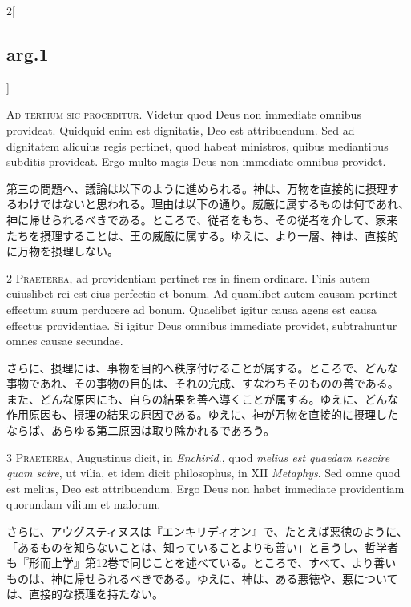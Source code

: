 \documentclass[paper=a4paper,fontsize=10pt,jafontsize=9pt,titlepage]{jlreq}
\begin{document}
\begin{paracol}{2}[\subsection{arg.1}]

{\Huge A}{\scshape d tertium sic proceditur}. Videtur quod
Deus non immediate omnibus provideat. Quidquid enim est dignitatis, Deo
est attribuendum. Sed ad dignitatem alicuius regis pertinet, quod habeat
ministros, quibus mediantibus subditis provideat. Ergo multo magis Deus
non immediate omnibus providet.

\switchcolumn

第三の問題へ、議論は以下のように進められる。神は、万物を直接的に摂理す
るわけではないと思われる。理由は以下の通り。威厳に属するものは何であれ、
神に帰せられるべきである。ところで、従者をもち、その従者を介して、家来
たちを摂理することは、王の威厳に属する。ゆえに、より一層、神は、直接的
に万物を摂理しない。

\switchcolumn*

2 {\scshape Praeterea}, ad providentiam pertinet res in
finem ordinare. Finis autem cuiuslibet rei est eius perfectio et
bonum. Ad quamlibet autem causam pertinet effectum suum perducere ad
bonum. Quaelibet igitur causa agens est causa effectus providentiae. Si
igitur Deus omnibus immediate providet, subtrahuntur omnes causae
secundae.

\switchcolumn

さらに、摂理には、事物を目的へ秩序付けることが属する。ところで、どんな
事物であれ、その事物の目的は、それの完成、すなわちそのものの善である。
また、どんな原因にも、自らの結果を善へ導くことが属する。ゆえに、どんな
作用原因も、摂理の結果の原因である。ゆえに、神が万物を直接的に摂理した
ならば、あらゆる第二原因は取り除かれるであろう。

\switchcolumn*

3 {\scshape Praeterea}, Augustinus dicit, in {\itshape Enchirid}.,
quod {\itshape melius est quaedam nescire quam scire}, ut vilia, et idem dicit
philosophus, in XII {\itshape Metaphys}. Sed omne quod est melius, Deo est
attribuendum. Ergo Deus non habet immediate providentiam quorundam
vilium et malorum.

\switchcolumn

さらに、アウグスティヌスは『エンキリディオン』で、たとえば悪徳のように、
「あるものを知らないことは、知っていることよりも善い」と言うし、哲学者
も『形而上学』第12巻で同じことを述べている。ところで、すべて、より善い
ものは、神に帰せられるべきである。ゆえに、神は、ある悪徳や、悪について
は、直接的な摂理を持たない。


\end{paracol}
\end{document}

